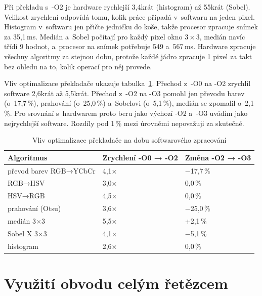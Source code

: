 
Při překladu s~-O2 je hardware rychlejší 3,4krát (histogram) až 55krát (Sobel). Velikost zrychlení odpovídá tomu, kolik práce připadá v~softwaru na jeden pixel. Histogram v~softwaru jen přičte jedničku do koše, takže procesor zpracuje snímek za 35,1\,ms. Medián a~Sobel počítají pro každý pixel okno 3\,×\,3, medián navíc třídí 9 hodnot, a~procesor na snímek potřebuje 549 a~567\,ms. Hardware zpracuje všechny algoritmy za stejnou dobu, protože každé jádro zpracuje 1 pixel za takt bez ohledu na to, kolik operací pro něj provede.

Vliv optimalizace překladače ukazuje tabulka~\ref{tab:prekladac}. Přechod z~-O0 na -O2 zrychlil software 2,6krát až 5,5krát. Přechod z~-O2 na -O3 pomohl jen převodu barev (o~17,7\,\%), prahování (o~25,0\,\%) a~Sobelovi (o~5,1\,\%), medián se zpomalil o~2,1\,\%. Pro srovnání s~hardwarem proto beru jako výchozí -O2 a~-O3 uvádím jako nejrychlejší software. Rozdíly pod 1\,\% mezi úrovněmi nepovažuji za skutečné.


\begin{table}[htbp]
    \centering
    \caption{Vliv optimalizace překladače na dobu softwarového zpracování}
    \label{tab:prekladac}
    \begin{tabular}{p{4.6cm}p{4.4cm}p{4.4cm}}
        \toprule
        Algoritmus & Zrychlení -O0 → -O2 & Změna -O2 → -O3 \\
        \midrule
        převod barev RGB→YCbCr & 4,1× & −17,7\,\% \\
        RGB→HSV & 3,0× & 0,0\,\% \\
        HSV→RGB & 4,5× & 0,0\,\% \\
        prahování (Otsu) & 3,6× & −25,0\,\% \\
        medián 3×3 & 5,5× & +2,1\,\% \\
        Sobel X 3×3 & 4,1× & −5,1\,\% \\
        histogram & 2,6× & 0,0\,\% \\
        \bottomrule
    \end{tabular}
\end{table}



\section{Využití obvodu celým řetězcem}
\label{sec:vretezec}


